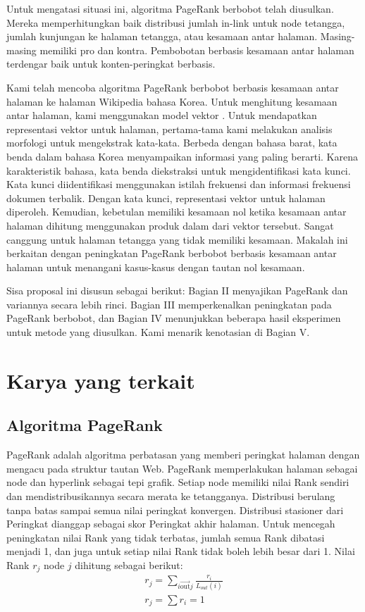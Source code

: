 \documentclass[conference]{IEEEtran}
\begin{document}
Untuk mengatasi situasi ini, algoritma PageRank berbobot \cite{xing2004weighted, qiao2010simrank,kumar2013pagerank} telah diusulkan. Mereka memperhitungkan baik distribusi jumlah in-link untuk node tetangga, jumlah kunjungan ke halaman tetangga, atau kesamaan antar halaman. Masing-masing memiliki pro dan kontra. Pembobotan berbasis kesamaan antar halaman terdengar baik untuk konten-peringkat berbasis.

Kami telah mencoba algoritma PageRank berbobot berbasis kesamaan antar halaman ke halaman Wikipedia bahasa Korea. Untuk menghitung kesamaan antar halaman, kami menggunakan model vektor \cite{}. Untuk mendapatkan representasi vektor untuk halaman, pertama-tama kami melakukan analisis morfologi untuk mengekstrak kata-kata. Berbeda dengan bahasa barat, kata benda dalam bahasa Korea menyampaikan informasi yang paling berarti. Karena karakteristik bahasa, kata benda diekstraksi untuk mengidentifikasi kata kunci. Kata kunci diidentifikasi menggunakan istilah frekuensi dan informasi frekuensi dokumen terbalik. Dengan kata kunci, representasi vektor untuk halaman diperoleh. Kemudian, kebetulan memiliki kesamaan nol ketika kesamaan antar halaman dihitung menggunakan produk dalam dari vektor tersebut. Sangat canggung untuk halaman tetangga yang tidak memiliki kesamaan. Makalah ini berkaitan dengan peningkatan PageRank berbobot berbasis kesamaan antar halaman untuk menangani kasus-kasus dengan tautan nol kesamaan.

Sisa proposal ini disusun sebagai berikut: Bagian II menyajikan PageRank dan variannya secara lebih rinci. Bagian III memperkenalkan peningkatan pada PageRank berbobot, dan Bagian IV menunjukkan beberapa hasil eksperimen untuk metode yang diusulkan. Kami menarik kenotasian di Bagian V.

\section{Karya yang terkait}

\subsection{Algoritma PageRank}

PageRank \cite{brin1998anatomy} adalah algoritma perbatasan yang memberi peringkat halaman dengan mengacu pada struktur tautan Web. PageRank memperlakukan halaman sebagai node dan hyperlink sebagai tepi grafik. Setiap node memiliki nilai Rank sendiri dan mendistribusikannya secara merata ke tetangganya. Distribusi berulang tanpa batas sampai semua nilai peringkat konvergen. Distribusi stasioner dari Peringkat dianggap sebagai skor Peringkat akhir halaman. Untuk mencegah peningkatan nilai Rank yang tidak terbatas, jumlah semua Rank dibatasi menjadi 1, dan juga untuk setiap nilai Rank tidak boleh lebih besar dari 1. Nilai Rank \(r_{j}\) node \(j\) dihitung sebagai berikut:
\begin{eqnarray}
    r_{j} = \sum_{i\overrightarrow{\text {out}} j}{\frac {r_{i}} {L_{out}(i)}}\\
    r_{j} = \sum r_{ i } = 1
\end{eqnarray}
\end{document}
